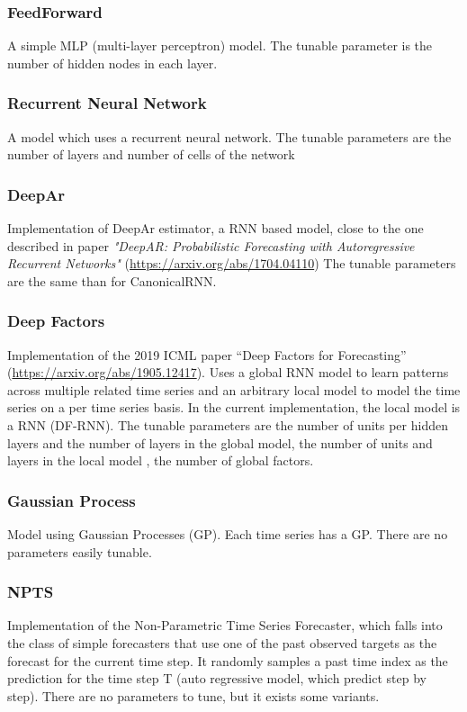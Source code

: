 \documentclass[a4paper, 12pt]{article}
\begin{document}
\subsubsection{FeedForward}
A simple MLP (multi-layer perceptron) model.
The tunable parameter is the number of hidden nodes in each layer.

\subsubsection{Recurrent Neural Network}
A model which uses a recurrent neural network.
The tunable parameters are the number of layers and number of cells of the network

\subsubsection{DeepAr}
Implementation of DeepAr estimator, a RNN based model, close to the one described in paper 
\textit{"DeepAR: Probabilistic Forecasting with Autoregressive Recurrent Networks"} (\url{https://arxiv.org/abs/1704.04110})
The tunable parameters are the same than for CanonicalRNN.

\subsubsection{Deep Factors}
Implementation of the 2019 ICML paper “Deep Factors for Forecasting” (\url{https://arxiv.org/abs/1905.12417}).
Uses a global RNN model to learn patterns across multiple related time series and an arbitrary local model to model the time series on a per time series basis. 
In the current implementation, the local model is a RNN (DF-RNN).
The tunable parameters are the number of units per hidden layers and the number of layers in the global model, the number of units and layers in the local model
, the number of global factors.

\subsubsection{Gaussian Process}
Model using Gaussian Processes (GP).
Each time series has a GP.
There are no parameters easily tunable.

\subsubsection{NPTS}
Implementation of the Non-Parametric Time Series Forecaster, 
which falls into the class of simple forecasters that use one of the past observed targets as the forecast for 
the current time step. It randomly samples a past time index as the prediction for the time step T (auto regressive model, which predict step by step).
There are no parameters to tune, but it exists some variants.
\end{document}
